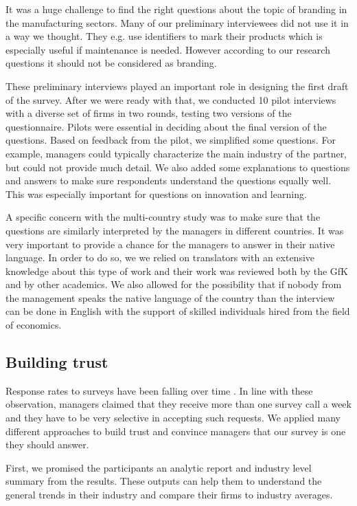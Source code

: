 \usepackage{}\documentclass[final, dvipsnames, authoryear,12pt]{elsarticle}
\begin{document}
It was a huge challenge to find the right questions about the topic of branding in the manufacturing sectors. Many of our preliminary interviewees did not use it in a way we thought. They e.g. use identifiers to mark their products which is especially useful if maintenance is needed. However according to our research questions it should not be considered as branding.

These preliminary interviews played an important role in designing the first draft of the survey. After we were ready with that, we conducted 10 pilot interviews with a diverse set of firms in two rounds, testing two versions of the questionnaire. Pilots were essential in deciding about the final version of the questions. Based on feedback from the pilot, we simplified some questions. For example, managers could typically characterize the main industry of the partner, but could not provide much detail. We also added some explanations to questions and answers to make sure respondents understand the questions equally well. This was especially important for questions on innovation and learning. 

A specific concern with the multi-country study was to make sure that the questions are similarly interpreted by the managers in different countries. It was very important to provide a chance for the managers to answer in their native language. In order to do so, we we relied on translators with an extensive knowledge about this type of work and their work was reviewed both by the GfK and by other academics. We also allowed for the possibility that if nobody from the management speaks the native language of the country than the interview can be done in English with the support of skilled individuals hired from the field of economics.

\subsection{Building trust}
\label{sec:trust}

Response rates to surveys have been falling over time \citep{Bloom2014-hc}. In line with these observation, managers claimed that they receive more than one survey call a week and they have to be very selective in accepting such requests. We applied many different approaches to build trust and convince managers that our survey is one they should answer.

First, we promised the participants an analytic report and industry level summary from the results. These outputs can help them to understand the general trends in their industry and compare their firms to industry averages.
\end{document}
